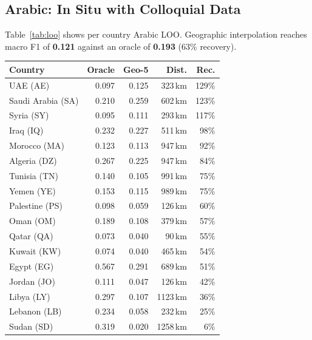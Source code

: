 \documentclass[11pt]{article}
\begin{document}
\subsection{Arabic: In Situ with Colloquial Data}
\label{sec:arabic}

Table~\ref{tab:loo} shows per country Arabic LOO.
Geographic interpolation reaches macro F1 of \textbf{0.121} against an oracle of \textbf{0.193} (63\% recovery).

\begin{table}[t]
\centering
\small
\setlength{\tabcolsep}{4.5pt}
\begin{tabular}{lrrrr}
\toprule
\textbf{Country} & \textbf{Oracle} & \textbf{Geo-5} & \textbf{Dist.} & \textbf{Rec.} \\
\midrule
\rowcolor{best}
UAE (AE)          & 0.097 & 0.125 &  323\,km & 129\% \\
\rowcolor{best}
Saudi Arabia (SA) & 0.210 & 0.259 &  602\,km & 123\% \\
\rowcolor{best}
Syria (SY)        & 0.095 & 0.111 &  293\,km & 117\% \\
\rowcolor{best}
Iraq (IQ)         & 0.232 & 0.227 &  511\,km &  98\% \\
\rowcolor{high}
Morocco (MA)      & 0.123 & 0.113 &  947\,km &  92\% \\
\rowcolor{high}
Algeria (DZ)      & 0.267 & 0.225 &  947\,km &  84\% \\
\rowcolor{high}
Tunisia (TN)      & 0.140 & 0.105 &  991\,km &  75\% \\
\rowcolor{high}
Yemen (YE)        & 0.153 & 0.115 &  989\,km &  75\% \\
\rowcolor{high}
Palestine (PS)    & 0.098 & 0.059 &  126\,km &  60\% \\
\rowcolor{mid}
Oman (OM)         & 0.189 & 0.108 &  379\,km &  57\% \\
\rowcolor{mid}
Qatar (QA)        & 0.073 & 0.040 &   90\,km &  55\% \\
\rowcolor{mid}
Kuwait (KW)       & 0.074 & 0.040 &  465\,km &  54\% \\
\rowcolor{mid}
Egypt (EG)        & 0.567 & 0.291 &  689\,km &  51\% \\
\rowcolor{mid}
Jordan (JO)       & 0.111 & 0.047 &  126\,km &  42\% \\
\rowcolor{mid}
Libya (LY)        & 0.297 & 0.107 & 1123\,km &  36\% \\
\rowcolor{low}
Lebanon (LB)      & 0.234 & 0.058 &  232\,km &  25\% \\
\rowcolor{low}
Sudan (SD)        & 0.319 & 0.020 & 1258\,km &   6\% \\

\end{tabular}
\end{table}
\end{document}
